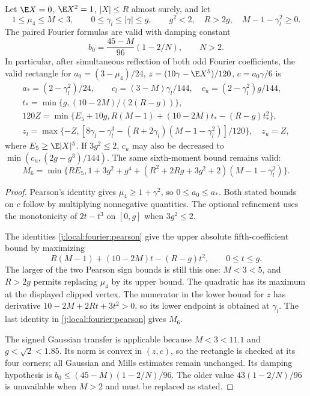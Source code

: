 \begin{proposition}\label{j:local:paired-rectangle}
Let $\E X=0$, $\E X^2=1$, $|X|\le R$ almost surely, and let
\[
 1\le\mu_4\le M<3,\qquad
 0\le\gamma_l\le|\gamma|\le g,\qquad g^2<2,\quad R>2g,
 \quad M-1-\gamma_l^2\ge0.
\]
The paired Fourier formulas are valid with damping constant
\[
                 b_0=\frac{45-M}{96}(1-2/N),\qquad N>2.
\]
In particular, after simultaneous reflection of both odd Fourier
coefficients, the valid rectangle for
$a_0=(3-\mu_4)/24$, $z=(10\gamma-\E X^5)/120$,
$c=a_0\gamma/6$ is
\begin{gather*}
 a_*=(2-\gamma_l^2)/24,\qquad
 c_l=(3-M)\gamma_l/144,\quad
 c_u=(2-\gamma_l^2)g/144,\\
 t_* =\min\{g,(10-2M)/(2(R-g))\},\\
 120Z=\min\{E_5+10g,R(M-1)+(10-2M)t_*-(R-g)t_*^2\},\\
 z_l=\max\{-Z,[8\gamma_l-\gamma_l^3
        -(R+2\gamma_l)(M-1-\gamma_l^2)]/120\},\quad z_u=Z,
\end{gather*}
where $E_5\ge\E|X|^5$. If $3g^2\le2$, $c_u$ may also be decreased
to $\min(c_u,(2g-g^3)/144)$.
The same sixth-moment bound remains valid:
\[
 M_6=\min\{RE_5,1+3g^2+g^4+
 (R^2+2Rg+3g^2+2)(M-1-\gamma_l^2)\}.
\]
\end{proposition}
\begin{proof}
Pearson's identity gives $\mu_4\ge1+\gamma^2$, so $0\le a_0\le a_*$.
Both stated bounds on $c$ follow by multiplying nonnegative quantities.
The optional refinement uses the monotonicity of $2t-t^3$ on
$[0,g]$ when $3g^2\le2$.

The identities \eqref{j:local:fourier:pearson} give the upper absolute
fifth-coefficient bound by maximizing
\[
 R(M-1)+(10-2M)t-(R-g)t^2,\qquad0\le t\le g.
\]
The larger of the two Pearson sign bounds is still this one: $M<3<5$,
and $R>2g$ permits replacing $\mu_4$ by its upper bound. The quadratic
has its maximum at the displayed clipped vertex. The numerator in the
lower bound for $z$ has derivative
$10-2M+2Rt+3t^2>0$, so its lower endpoint is obtained at $\gamma_l$.
The last identity in \eqref{j:local:fourier:pearson} gives $M_6$.

The signed Gaussian transfer is applicable because $M<3<11.1$ and
$g<\sqrt2<1.85$. Its norm is convex in $(z,c)$, so the rectangle is
checked at its four corners; all Gaussian and Mills estimates remain
unchanged. Its damping hypothesis is
$b_0\le(45-M)(1-2/N)/96$. The older value
$43(1-2/N)/96$ is unavailable when $M>2$ and must be replaced as stated.
\end{proof}

